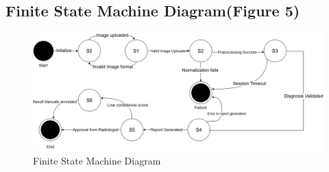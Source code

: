 \documentclass[12pt]{article}
\begin{document}
\subsection{Finite State Machine Diagram(Figure 5)}
\begin{figure}[H]
    \centering
    \includegraphics[width=1\linewidth]{statem.png}
    \caption{Finite State Machine Diagram}
    \label{fig:enter-label}
\end{figure}

\newpage
\end{document}
